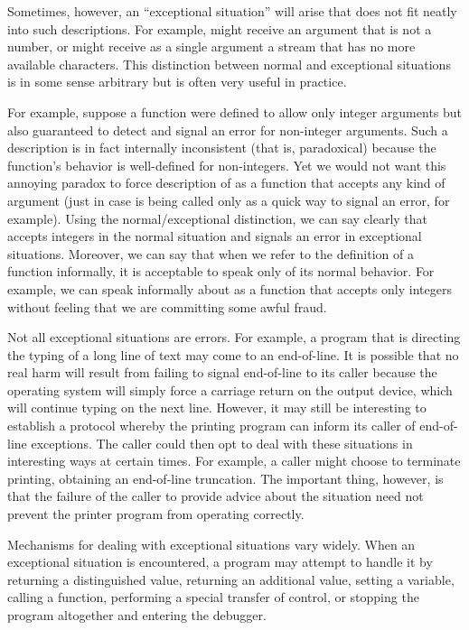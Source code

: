 Sometimes, however, an ``exceptional situation'' will arise that does not fit
neatly into such descriptions. For example, \cdf{+} might receive an argument
that is not a number, or  might receive as a single argument
a stream that has no more available characters.  This distinction between normal
and exceptional situations is in some sense arbitrary but is often very
useful in practice.

For example, suppose a function  were defined to allow only
integer arguments but also guaranteed to
detect and signal an error for non-integer arguments.
Such a description is in fact internally inconsistent (that is,
paradoxical) because the function's behavior is well-defined for non-integers.
Yet we would not want this annoying paradox to force description of 
as a function that accepts any kind of argument (just in case 
is being called only as a quick way to signal an error, for example).
Using the normal/exceptional distinction, we can say clearly that  accepts integers
in the normal situation and signals an error in exceptional situations.
Moreover, we can say that when we refer to the definition of a
function informally, it is acceptable to speak only of its normal behavior.
For example, we can speak informally about  as a function that accepts only
integers without feeling that we are committing some awful fraud.

Not all exceptional situations are errors.  For example, a program that is
directing the typing of a long line of text may come to an end-of-line.
It is possible that no real harm will result from failing to signal end-of-line
to its caller because the operating system will simply force a carriage
return on the output device, which will continue typing on the next line. However, it
may still be interesting to establish a protocol whereby the printing program can
inform its caller of end-of-line exceptions. The caller could
then opt to deal with these situations in interesting ways at certain times.
For example, a caller might choose to terminate printing, obtaining an end-of-line
truncation. The important thing, however, is that the failure of the
caller to provide advice about the situation need not prevent
the printer program from operating correctly.

Mechanisms for dealing with exceptional situations vary widely. When an
exceptional situation is encountered, a program may attempt to handle
it by returning a distinguished value, returning an additional value,
setting a variable, calling a function, performing a special transfer of
control, or stopping the program altogether and entering the debugger.


